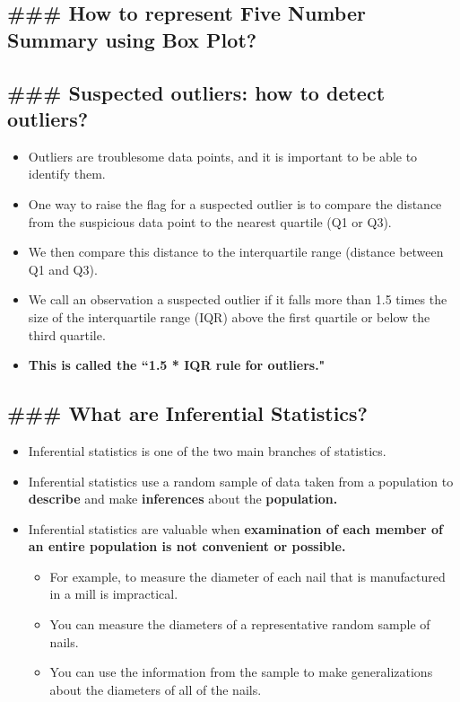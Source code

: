 \documentclass[11pt]{article}
\providecommand{\tightlist}{%
      \setlength{\itemsep}{0pt}\setlength{\parskip}{0pt}}
\begin{document}
    \subsection{\#\#\# How to represent Five Number Summary using Box
Plot?}\label{how-to-represent-five-number-summary-using-box-plot}

    

    \subsection{\#\#\# Suspected outliers: how to detect
outliers?}\label{suspected-outliers-how-to-detect-outliers}

\begin{itemize}
\tightlist
\item
  Outliers are troublesome data points, and it is important to be able
  to identify them.
\item
  One way to raise the flag for a suspected outlier is to compare the
  distance from the suspicious data point to the nearest quartile (Q1 or
  Q3).
\item
  We then compare this distance to the interquartile range (distance
  between Q1 and Q3).
\item
  We call an observation a suspected outlier if it falls more than 1.5
  times the size of the interquartile range (IQR) above the first
  quartile or below the third quartile.
\item
  \textbf{This is called the ``1.5 * IQR rule for outliers."}
\end{itemize}

    \subsection{\#\#\# What are Inferential
Statistics?}\label{what-are-inferential-statistics}

    \begin{itemize}
\tightlist
\item
  Inferential statistics is one of the two main branches of statistics.
\item
  Inferential statistics use a random sample of data taken from a
  population to \textbf{describe} and make \textbf{inferences} about the
  \textbf{population.}
\item
  Inferential statistics are valuable when \textbf{examination of each
  member of an entire population is not convenient or possible. }

  \begin{itemize}
  \tightlist
  \item
    For example, to measure the diameter of each nail that is
    manufactured in a mill is impractical.
  \item
    You can measure the diameters of a representative random sample of
    nails.
  \item
    You can use the information from the sample to make generalizations
    about the diameters of all of the nails.
  \end{itemize}
\end{itemize}
\end{document}
